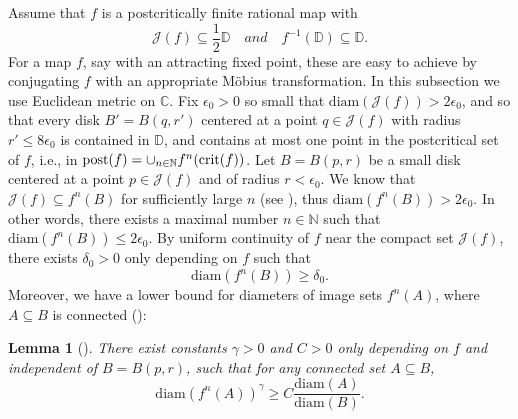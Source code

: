 \documentclass[12pt]{amsart}
\newtheorem{lem}[thm]{Lemma}
\newcommand{\C}{\mathbb{C}}
\newcommand{\D}{\mathbb{D}}
\newcommand{\N}{\mathbb{N}}
\newcommand{\sub}{\subseteq }
\newcommand{\J}{\mathcal{J}}
\begin{document}
Assume that $f$ is a postcritically finite rational map with 
$$\J(f)\sub \frac{1}{2}\D\quad and \quad f^{-1}(\D)\sub \D.$$
For a map $f$, say with an attracting fixed point, these are easy to achieve by conjugating $f$ with an appropriate M\"obius transformation. 
In this subsection we use Euclidean metric on $\C$.
Fix $\epsilon_0>0$ so small that $\mathrm{diam}(\J(f))>2\epsilon_0$, and so that every disk $B'=B(q,r')$ centered at a point $q\in \J(f)$ with radius
$r'\leq 8\epsilon_0$ is contained in $\D$, and contains at most one point in the postcritical set of $f$, i.e., in $\mathrm{post}(f)=\cup_{n\in\N}f^n({\rm crit}(f))$.   
Let $B=B(p,r)$ be a small disk centered at a point $p\in \J(f)$ and of radius $r<\epsilon_0$. We know that $\J(f)\sub f^n(B)$ for sufficiently large 
$n$ (see \cite[Theorem 4.2.5 (ii)]{Be}), thus $\mathrm{diam}(f^n(B))>2\epsilon_0$. 
In other words, there exists a maximal number $n\in \N$ such that $\mathrm{diam}(f^n(B))\leq 2\epsilon_0$.
By uniform continuity of $f$ near the compact set $\J(f)$, there exists $\delta_0>0$ only depending on $f$ such that 
$$\mathrm{diam}(f^n(B))\geq \delta_0.$$
Moreover, we have a lower bound for diameters of image sets $f^n(A)$, where $A\sub B$ is connected (\cite[Lemma 4.1]{BLM}):
\begin{lem}[\cite{BLM}]\label{lem:conformalelevator}
There exist constants $\gamma>0$ and $C>0$ only depending on $f$ and independent of $B=B(p,r)$, such that for any connected set $A\sub B$,
$$\mathrm{diam}(f^n(A))^\gamma\geq C\frac{\mathrm{diam}(A)}{\mathrm{diam}(B)}.$$
\end{lem}
\end{document}
